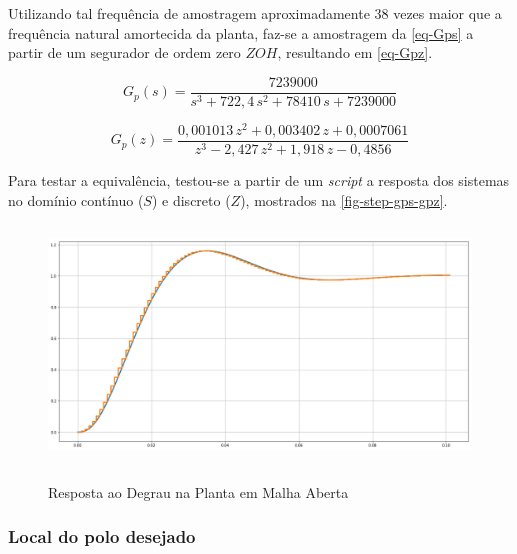 \documentclass[
	12pt,				%
	article,			%
	openright,			%
	oneside,
	a4paper,			%
	chapter=TITLE,		%
	section=TITLE,		%
	english,			%
	french,				%
	spanish,			%
	brazil,				%
]{abntex2}
\begin{document}
                Utilizando tal frequência de amostragem aproximadamente 38 vezes maior que a frequência natural amortecida da planta, faz-se a amostragem da \autoref{eq-Gps} a partir de um segurador de ordem zero $ZOH$, resultando em \autoref{eq-Gpz}.
                
                \begin{equation}
                    \label{eq-Gps}
                    G_p(s) = \frac{7239000}{s^3 +722,4\,s^2 +78410\,s +7239000}
                \end{equation}
                
                \begin{equation}
                    \label{eq-Gpz}
                    G_p(z) = \frac{0,001013\,z^2 + 0,003402\,z + 0,0007061}{ z^3 -2,427\,z^2 +1,918\,z -0,4856}
                \end{equation}
                
                Para testar a equivalência, testou-se a partir de um \textit{script} a resposta dos sistemas no domínio contínuo ($S$) e discreto ($Z$), mostrados na \autoref{fig-step-gps-gpz}.
                
                \FloatBarrier
                \begin{figure}[htbp]
                	\centering
                	\caption{Resposta ao Degrau na Planta em Malha Aberta}
                	\includegraphics[width=\textwidth,height=240px,keepaspectratio]{imgs/ftma/step-gps-gpz.png}
                	\label{fig-step-gps-gpz}
            	\end{figure}
                \FloatBarrier
        
            \subsubsection{Local do polo desejado}
        	
\end{document}
